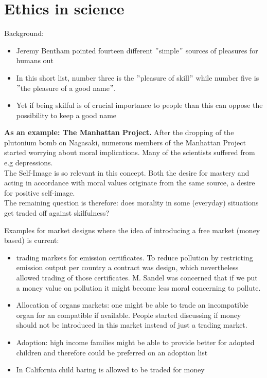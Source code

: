 

\chapter{Ethics in science}



Background:
\begin{itemize}
	\item Jeremy Bentham pointed fourteen different $"$simple$"$ sources of pleasures for humans out
	\item In this short list, number three is the $"$pleasure of skill$"$ while number five is $"$the pleasure of a good name$"$.
	\item Yet if being skilful is of crucial importance to people than this can oppose the possibility to keep a good name
\end{itemize}
  
  
  
\textbf{As an example: The Manhattan Project.} After the dropping of the plutonium bomb on Nagasaki, numerous members of the Manhattan Project started worrying about moral implications. Many of the scientists suffered from e.g depressions. \\ 

The Self-Image is so relevant in this concept. Both the desire for mastery and acting in accordance with moral values originate from the same source, a desire for positive self-image. \\ 

The remaining question is therefore: does morality in some (everyday) situations get traded off against skilfulness?



Examples for market designs where the idea of introducing a free market (money based) is current:
\begin{itemize}
	\item trading markets for emission certificates. To reduce pollution by restricting emission output per country a contract was design, which nevertheless allowed trading of those certificates. M. Sandel was concerned that if we put a money value on pollution it might become less moral concerning to pollute.
	\item Allocation of organs markets: one might be able to trade an incompatible organ for an compatible if available. People started discussing if money should not be introduced in this market instead of just a trading market.
	\item Adoption: high income families might be able to provide better for adopted children and therefore could be preferred on an adoption list
	\item In California child baring is allowed to be traded for money 
\end{itemize}

